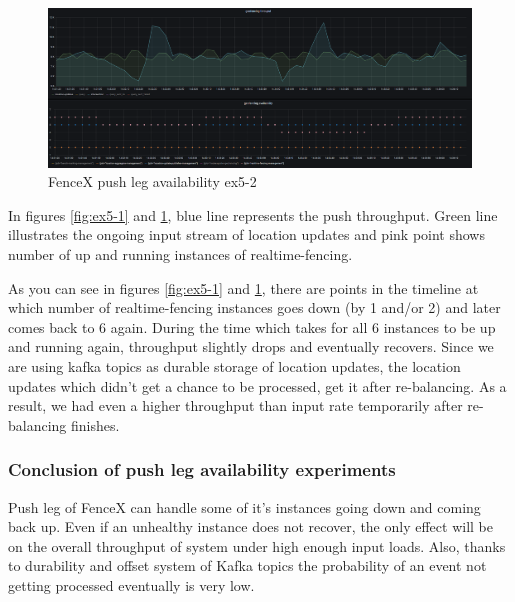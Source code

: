 \documentclass[a4]{report}
\begin{document}
    \begin{figure}[h!]
        \centering
        \caption{FenceX push leg availability ex5-2}
        \label{fig:ex5-2}
        \includegraphics[width=\linewidth, scale=2]{images/evaluation/ex5-benchmarking-ongoing-2per7sec.png}
    \end{figure}

    In figures \ref{fig:ex5-1} and \ref{fig:ex5-2}, blue line represents the push throughput.
    Green line illustrates the ongoing input stream of location updates and pink point shows
    number of up and running instances of realtime-fencing.

    As you can see in figures \ref{fig:ex5-1} and \ref{fig:ex5-2}, there are points in the timeline at which number of
    realtime-fencing instances goes down (by 1 and/or 2) and later comes back to 6 again.
    During the time which takes for all 6 instances to be up and running again, throughput slightly drops and
    eventually recovers.
    Since we are using kafka topics as durable storage of location updates, the location updates which
    didn't get a chance to be processed, get it after re-balancing.
    As a result, we had even a higher throughput than input rate temporarily after re-balancing finishes.

    \subsubsection{Conclusion of push leg availability experiments}
    Push leg of FenceX can handle some of it's instances going down and coming back up.
    Even if an unhealthy instance does not recover, the only effect will be on the overall throughput of system under
    high enough input loads.
    Also, thanks to durability and offset system of Kafka topics the probability of an event not getting processed
    eventually is very low.
\end{document}
